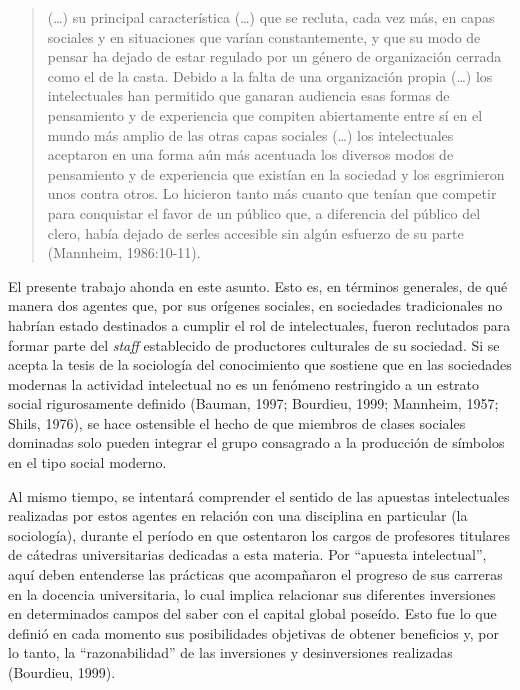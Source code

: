 \begin{quote}
(\dots) su principal característica (\dots) que se recluta, cada vez más, en capas sociales y en situaciones que varían constantemente, y que su modo de pensar ha dejado de estar regulado por un género de organización cerrada como el de la casta. Debido a la falta de una organización propia (\dots) los intelectuales han permitido que ganaran audiencia esas formas de pensamiento y de experiencia que compiten abiertamente entre sí en el mundo más amplio de las otras capas sociales (\dots) los intelectuales aceptaron en una forma aún más acentuada los diversos modos de pensamiento y de experiencia que existían en la sociedad y los esgrimieron unos contra otros. Lo hicieron tanto más cuanto que tenían que competir para conquistar el favor de un público que, a diferencia del público del clero, había dejado de serles accesible sin algún esfuerzo de su parte (Mannheim, 1986:10-11).
\end{quote}

El presente trabajo ahonda en este asunto. Esto es, en términos generales, de qué manera dos agentes que, por sus orígenes sociales, en sociedades tradicionales no habrían estado destinados a cumplir el rol de intelectuales, fueron reclutados para formar parte del \emph{staff} establecido de productores culturales de su sociedad. Si se acepta la tesis de la sociología del conocimiento que sostiene que en las sociedades modernas la actividad intelectual no es un fenómeno restringido a un estrato social rigurosamente definido (Bauman, 1997; Bourdieu, 1999; Mannheim, 1957; Shils, 1976), se hace ostensible el hecho de que miembros de clases sociales dominadas solo pueden integrar el grupo consagrado a la producción de símbolos en el tipo social moderno.

Al mismo tiempo, se intentará comprender el sentido de las apuestas intelectuales realizadas por estos agentes en relación con una disciplina en particular (la sociología), durante el período en que ostentaron los cargos de profesores titulares de cátedras universitarias dedicadas a esta materia. Por \enquote{apuesta intelectual}, aquí deben entenderse las prácticas que acompañaron el progreso de sus carreras en la docencia universitaria, lo cual implica relacionar sus diferentes inversiones en determinados campos del saber con el capital global poseído. Esto fue lo que definió en cada momento sus posibilidades objetivas de obtener beneficios y, por lo tanto, la \enquote{razonabilidad} de las inversiones y desinversiones realizadas (Bourdieu, 1999).

